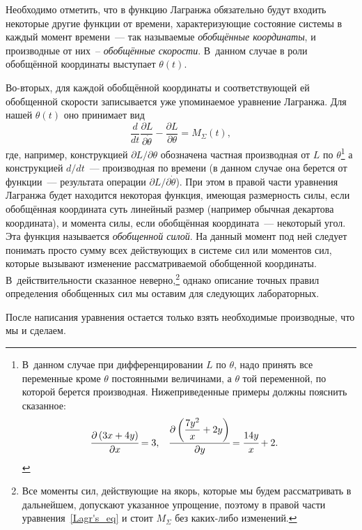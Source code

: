 \documentclass[12pt,a4paper,openany]{extarticle}
\begin{document}
Необходимо отметить, что в функцию Лагранжа обязательно будут входить некоторые другие функции от времени, характеризующие состояние системы в каждый момент времени~--- так называемые {\itshape обобщённые координаты}, и производные от них~-- {\itshape обобщённые скорости}. 
В~данном случае в роли обобщённой координаты выступает $\theta(t)$.

Во-вторых, для каждой обобщённой координаты и соответствующей ей обобщенной скорости записывается уже упоминаемое уравнение Лагранжа.
Для нашей $\theta(t)$ оно принимает вид
\begin{equation}\label{Lagr's_eq}
	\frac{d}{dt}\frac{\partial L}{\partial\dot\theta}-\frac{\partial L}{\partial\theta} = M_\varSigma(t),
\end{equation}
где, например, конструкцией $\partial L/\partial\theta$ обозначена частная производная от $L$ по $\theta$\lefteqn{,}\footnote{В~данном случае при дифференцировании $L$ по $\theta$, надо принять все переменные кроме $\theta$ постоянными величинами, а $\theta$ той переменной, по которой берется производная. Нижеприведенные примеры должны пояснить сказанное:
\begin{align*}
	\cfrac{\partial\left(3x + 4y\right)}{\partial x} &= 3, & 
	\cfrac{\partial\left(\dfrac{7y^2}{x} + 2y\right)}{\partial y} &= \cfrac{14y}{x} + 2\ldotp
\end{align*}} а конструкцией $d/dt$~--- производная по времени (в данном случае она берется от функции~--- результата операции $\partial L/\partial\dot\theta$). 
При этом в правой части уравнения Лагранжа будет находится некоторая функция, имеющая размерность силы, если обобщённая координата суть линейный размер (например обычная декартова координата), и момента силы, если обобщённая координата~--- некоторый угол.
Эта функция называется \textit{обобщенной силой}.
На данный момент под ней следует понимать просто сумму всех действующих в системе сил или моментов сил, которые вызывают изменение рассматриваемой обобщенной координаты.
В~действительности сказанное неверно\lefteqn,\footnote{Все моменты сил, действующие на якорь, которые мы будем рассматривать в дальнейшем, допускают указанное упрощение, поэтому в правой части уравнения~\eqref{Lagr's_eq} и стоит $M_\varSigma$ без каких-либо изменений.} однако описание точных правил определения обобщенных сил мы оставим для следующих лабораторных.

После написания уравнения остается только взять необходимые производные, что мы и сделаем.
 
\end{document}
